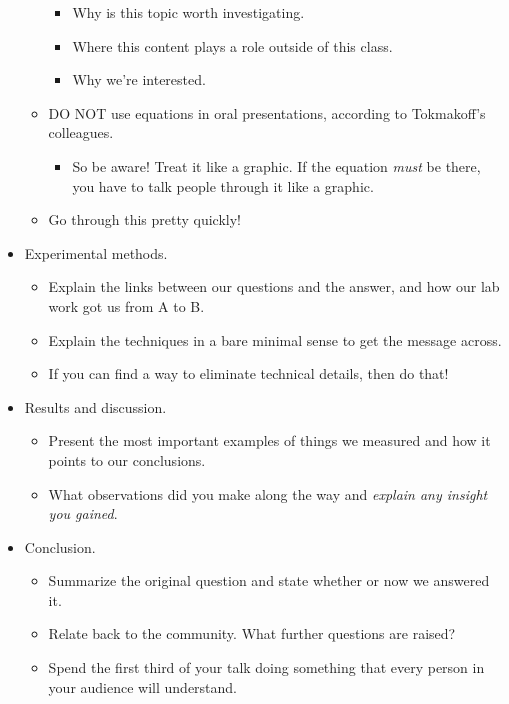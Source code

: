 \documentclass[../notes.tex]{subfiles}
\begin{document}
\begin{itemize}
\begin{itemize}
\begin{itemize}
            \item Why is this topic worth investigating.
            \item Where this content plays a role outside of this class.
            \item Why we're interested.
        \end{itemize}
        \item DO NOT use equations in oral presentations, according to Tokmakoff's colleagues.
        \begin{itemize}
            \item So be aware! Treat it like a graphic. If the equation \emph{must} be there, you have to talk people through it like a graphic.
        \end{itemize}
        \item Go through this pretty quickly!
    \end{itemize}
    \item Experimental methods.
    \begin{itemize}
        \item Explain the links between our questions and the answer, and how our lab work got us from A to B.
        \item Explain the techniques in a bare minimal sense to get the message across.
        \item If you can find a way to eliminate technical details, then do that!
    \end{itemize}
    \item Results and discussion.
    \begin{itemize}
        \item Present the most important examples of things we measured and how it points to our conclusions.
        \item What observations did you make along the way and \emph{explain any insight you gained}.
    \end{itemize}
    \item Conclusion.
    \begin{itemize}
        \item Summarize the original question and state whether or now we answered it.
        \item Relate back to the community. What further questions are raised?
        \item Spend the first third of your talk doing something that every person in your audience will understand.
        \begin{itemize}

\end{itemize}
\end{itemize}
\end{itemize}
\end{document}
